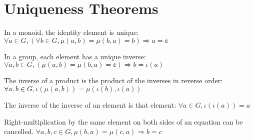 \section{Uniqueness Theorems}

\begin{theorem}
    \label{theorem : identity_uniqueness}
    \leanok
    In a monoid, the identity element is unique:
    $\forall a \in G, (\forall b \in G, \mu(a, b) = \mu(b, a) = b) \Rightarrow a = \mathbb{e}$
  \end{theorem}

\begin{theorem}
    \label{theorem : inverse_uniqueness}
    \leanok
    In a group, each element has a unique inverse:
    $\forall a, b \in G, (\mu(a, b) = \mu(b, a) = \mathbb{e}) \Rightarrow b = \iota(a)$
  \end{theorem}

\begin{theorem}
  \label{theorem : shoes_and_socks}
  \leanok
  The inverse of a product is the product of the inverses in reverse order:
  $\forall a, b \in G, \iota(\mu(a, b)) = \mu(\iota(b), \iota(a))$
\end{theorem}

\begin{theorem}
  \label{theorem : inv_inv}
  \leanok
  The inverse of the inverse of an element is that element:
  $\forall a \in G, \iota(\iota(a)) = a$
\end{theorem}

\begin{theorem}
  \label{definition : right_cancel}
  \leanok
  Right-multiplication by the same element on both sides of an equation can be cancelled.
  $\forall a, b, c \in G, \mu(b, a) = \mu(c, a) \Rightarrow b = c$
\end{theorem}
